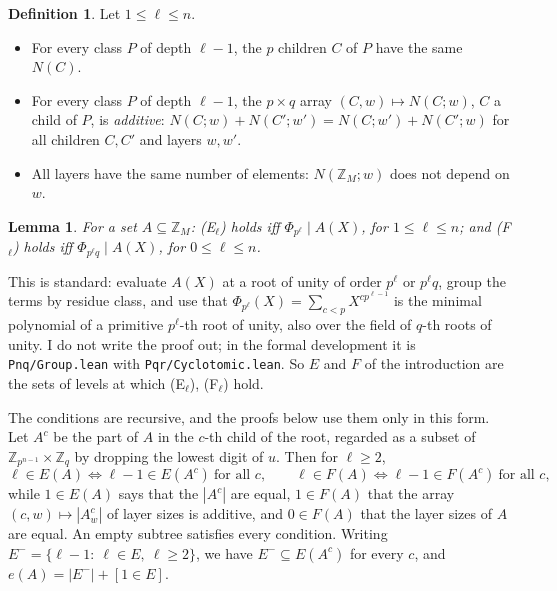 \documentclass[11pt,a4paper]{amsart}
\newtheorem{lemma}[theorem]{Lemma}
\theoremstyle{definition}
\newtheorem{definition}[theorem]{Definition}
\theoremstyle{remark}
\newcommand{\Z}{\mathbb{Z}}
\newcommand{\lean}[1]{\texttt{#1}}
\begin{document}
\begin{definition}\label{Y:def:levels}
Let $1\le\ell\le n$.
\begin{itemize}
\item[(E$_\ell$)] For every class $P$ of depth $\ell-1$, the $p$ children $C$ of $P$ have the same $N(C)$.
\item[(F$_\ell$)] For every class $P$ of depth $\ell-1$, the $p\times q$ array $(C,w)\mapsto N(C;w)$, $C$ a
child of $P$, is \emph{additive}: $N(C;w)+N(C';w')=N(C;w')+N(C';w)$ for all children $C,C'$ and layers
$w,w'$.
\item[(F$_0$)] All layers have the same number of elements: $N(\Z_M;w)$ does not depend on $w$.
\end{itemize}
\end{definition}

\begin{lemma}\label{Y:lem:cyclo}
For a set $A\subseteq\Z_M$: {\rm (E$_\ell$)} holds iff $\Phi_{p^\ell}\mid A(X)$, for $1\le\ell\le n$; and
{\rm (F$_\ell$)} holds iff $\Phi_{p^\ell q}\mid A(X)$, for $0\le\ell\le n$.
\end{lemma}

This is standard: evaluate $A(X)$ at a root of unity of order $p^\ell$ or $p^\ell q$, group the terms by residue
class, and use that $\Phi_{p^\ell}(X)=\sum_{c<p}X^{cp^{\ell-1}}$ is the minimal polynomial of a primitive
$p^\ell$-th root of unity, also over the field of $q$-th roots of unity. I do not write the proof out; in the
formal development it is \lean{Pnq/Group.lean} with \lean{Pqr/Cyclotomic.lean}. So $E$ and $F$ of the
introduction are the sets of levels at which (E$_\ell$), (F$_\ell$) hold.

The conditions are recursive, and the proofs below use them only in this form. Let
$A^c$ be the part of $A$ in the $c$-th child of the root, regarded as a subset of
$\Z_{p^{n-1}}\times\Z_q$ by dropping the lowest digit of $u$. Then for $\ell\ge 2$,
\begin{equation}\label{Y:eq:rec}
 \ell\in E(A)\iff \ell-1\in E(A^c)\ \text{for all } c,\qquad
 \ell\in F(A)\iff \ell-1\in F(A^c)\ \text{for all } c ,
\end{equation}
while $1\in E(A)$ says that the $|A^c|$ are equal, $1\in F(A)$ that the array $(c,w)\mapsto|A^c_w|$ of layer
sizes is additive, and $0\in F(A)$ that the layer sizes of $A$ are equal. An empty subtree satisfies every
condition. Writing $E^-=\{\ell-1:\ \ell\in E,\ \ell\ge 2\}$, we have $E^-\subseteq E(A^c)$ for every $c$, and
$e(A)=|E^-|+[1\in E]$.
\end{document}
